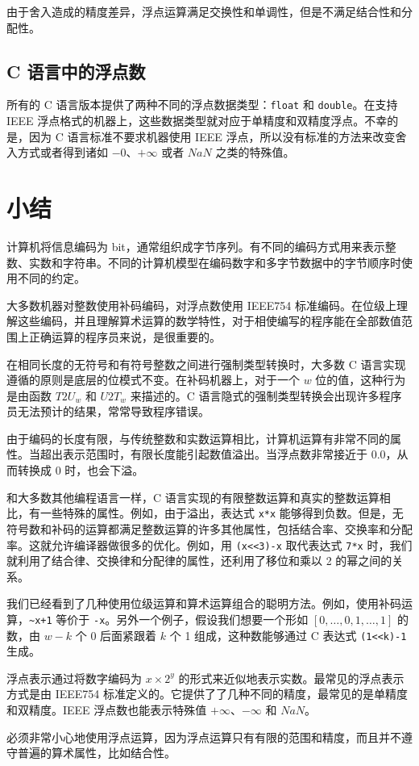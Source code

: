 由于舍入造成的精度差异，浮点运算满足交换性和单调性，但是不满足结合性和分配性。

\subsection{C 语言中的浮点数}

所有的 C 语言版本提供了两种不同的浮点数据类型：\verb|float| 和 \verb|double|。在支持 IEEE 浮点格式的机器上，这些数据类型就对应于单精度和双精度浮点。不幸的是，因为 C 语言标准不要求机器使用 IEEE 浮点，所以没有标准的方法来改变舍入方式或者得到诸如 $-0$、$+\infty$ 或者 $NaN$ 之类的特殊值。

\section{小结}

计算机将信息编码为 bit，通常组织成字节序列。有不同的编码方式用来表示整数、实数和字符串。不同的计算机模型在编码数字和多字节数据中的字节顺序时使用不同的约定。

大多数机器对整数使用补码编码，对浮点数使用 IEEE754 标准编码。在位级上理解这些编码，并且理解算术运算的数学特性，对于相使编写的程序能在全部数值范围上正确运算的程序员来说，是很重要的。

在相同长度的无符号和有符号整数之间进行强制类型转换时，大多数 C 语言实现遵循的原则是底层的位模式不变。在补码机器上，对于一个 $w$ 位的值，这种行为是由函数 $T2U_w$ 和 $U2T_w$ 来描述的。C 语言隐式的强制类型转换会出现许多程序员无法预计的结果，常常导致程序错误。

由于编码的长度有限，与传统整数和实数运算相比，计算机运算有非常不同的属性。当超出表示范围时，有限长度能引起数值溢出。当浮点数非常接近于 $0.0$，从而转换成 $0$ 时，也会下溢。

和大多数其他编程语言一样，C 语言实现的有限整数运算和真实的整数运算相比，有一些特殊的属性。例如，由于溢出，表达式 \verb|x*x| 能够得到负数。但是，无符号数和补码的运算都满足整数运算的许多其他属性，包括结合率、交换率和分配率。这就允许编译器做很多的优化。例如，用 \verb|(x<<3)-x| 取代表达式 \verb|7*x| 时，我们就利用了结合律、交换律和分配律的属性，还利用了移位和乘以 2 的幂之间的关系。

我们已经看到了几种使用位级运算和算术运算组合的聪明方法。例如，使用补码运算，\verb|~x+1| 等价于 \verb|-x|。另外一个例子，假设我们想要一个形如 $[0, \dots, 0, 1, \dots, 1]$ 的数，由 $w-k$ 个 0 后面紧跟着 $k$ 个 1 组成，这种数能够通过 C 表达式 \verb|(1<<k)-1| 生成。

浮点表示通过将数字编码为 $x \times 2^y$ 的形式来近似地表示实数。最常见的浮点表示方式是由 IEEE754 标准定义的。它提供了了几种不同的精度，最常见的是单精度和双精度。IEEE 浮点数也能表示特殊值 $+\infty$、$-\infty$ 和 $NaN$。

必须非常小心地使用浮点运算，因为浮点运算只有有限的范围和精度，而且并不遵守普遍的算术属性，比如结合性。

\endinput
